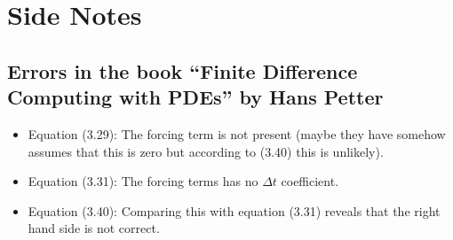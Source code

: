 \chapter{Side Notes}

\section{Errors in the book ``Finite Difference Computing with PDEs'' by Hans Petter}
\begin{itemize}[noitemsep]
	\item Equation (3.29): The forcing term is not present (maybe they have somehow assumes that this is zero but according to (3.40) this is unlikely).
	\item Equation (3.31): The forcing terms has no $ \Delta t $ coefficient.
	\item Equation (3.40): Comparing this with equation (3.31) reveals that the right hand side is not correct.
	
\end{itemize}
